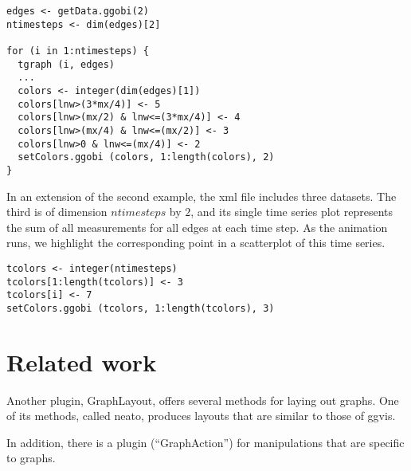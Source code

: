 \documentclass[11pt]{article}
\begin{document}
\begin{verbatim}
edges <- getData.ggobi(2)
ntimesteps <- dim(edges)[2]

for (i in 1:ntimesteps) {
  tgraph (i, edges)
  ...
  colors <- integer(dim(edges)[1])
  colors[lnw>(3*mx/4)] <- 5
  colors[lnw>(mx/2) & lnw<=(3*mx/4)] <- 4
  colors[lnw>(mx/4) & lnw<=(mx/2)] <- 3
  colors[lnw>0 & lnw<=(mx/4)] <- 2
  setColors.ggobi (colors, 1:length(colors), 2)
}
\end{verbatim}

In an extension of the second example, the xml file includes three
datasets.  The third is of dimension $ntimesteps$ by $2$, and its
single time series plot represents the sum of all measurements
for all edges at each time step.  As the animation runs,
we highlight the corresponding point in a scatterplot of this time series.

\begin{verbatim}
tcolors <- integer(ntimesteps)
tcolors[1:length(tcolors)] <- 3
tcolors[i] <- 7
setColors.ggobi (tcolors, 1:length(tcolors), 3)
\end{verbatim}

\section{Related work}

Another plugin, GraphLayout, offers several methods for laying
out graphs.  One of its methods, called neato, produces layouts
that are similar to those of ggvis.

In addition, there is a plugin (``GraphAction'') for manipulations
that are specific to graphs.


\end{document}
